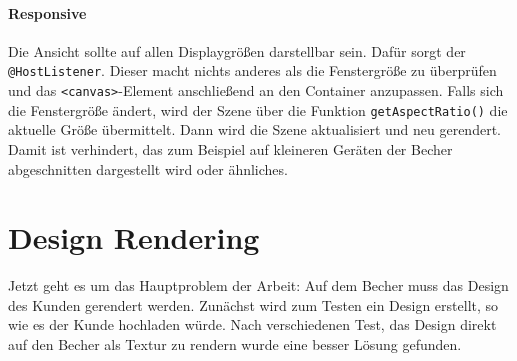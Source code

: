 \paragraph{Responsive} Die Ansicht sollte auf allen Displaygrößen darstellbar sein. Dafür sorgt der \texttt{@HostListener}. Dieser macht nichts anderes als die Fenstergröße zu überprüfen und das \texttt{<canvas>}-Element anschließend an den Container anzupassen. Falls sich die Fenstergröße ändert, wird der Szene über die Funktion \texttt{getAspectRatio()} die aktuelle Größe übermittelt. Dann wird die Szene aktualisiert und neu gerendert. Damit ist verhindert, das zum Beispiel auf kleineren Geräten der Becher abgeschnitten dargestellt wird oder ähnliches.
%
\section{Design Rendering}
\label{sec:umsetzung}
%
Jetzt geht es um das Hauptproblem der Arbeit: Auf dem Becher muss das Design des Kunden gerendert werden. Zunächst wird zum Testen ein Design erstellt, so wie es der Kunde hochladen würde. Nach verschiedenen Test, das Design direkt auf den Becher als Textur zu rendern wurde eine besser Lösung gefunden. 
